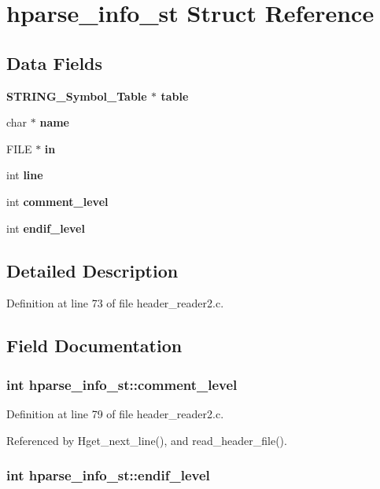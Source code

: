 \section{hparse\_\-info\_\-st Struct Reference}
\label{structhparse__info__st}
\subsection*{Data Fields}
\begin{CompactItemize}
\item 
\bf{STRING\_\-Symbol\_\-Table} $\ast$ \bf{table}
\item 
char $\ast$ \bf{name}
\item 
FILE $\ast$ \bf{in}
\item 
int \bf{line}
\item 
int \bf{comment\_\-level}
\item 
int \bf{endif\_\-level}
\end{CompactItemize}


\subsection{Detailed Description}




Definition at line 73 of file header\_\-reader2.c.

\subsection{Field Documentation}
\subsubsection{\setlength{\rightskip}{0pt plus 5cm}int \bf{hparse\_\-info\_\-st::comment\_\-level}}\label{structhparse__info__st_974f8dc473d77e6e5fd98d32004e1339}




Definition at line 79 of file header\_\-reader2.c.

Referenced by Hget\_\-next\_\-line(), and read\_\-header\_\-file().
\subsubsection{\setlength{\rightskip}{0pt plus 5cm}int \bf{hparse\_\-info\_\-st::endif\_\-level}}\label{structhparse__info__st_d88de4942e534b3a566cfef184eb944d}




